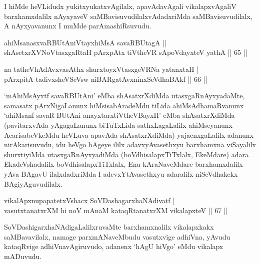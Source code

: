 \begin{artha}
I hiMde heVLidudx yukitxyukatxvAgilalx, apavAdavAgali vikalapxvAgaliV barxhamxdalilx nAyxyaveV saMBavisuvudilalxvAdadxriMda saMBavisuvudilalx, A nAyxyavanunx I muMde parAmashiRsuvudu.
\end{artha}


\begin{shl}
ahiMsanasxvaRBUtAniVtayxhiMsA savaRBUtagA ||  \\
shAsetxrXVNoVtasxgaRtaH pArxpAtx tiVtheVR sA\s poVdayxteV yathA \hfill||  65 ||  
\end{shl}

\begin{shl}
na tatheVhAdAvxvasAthx shurxtoyxVtasxgeVRNa yatanxtaH  | \\
pArxpitA tadivxsheVSeV\s sw niBARgatAvxninxSeVdhaBAkf \hfill ||  66 ||  
\end{shl}

\begin{artha}
`mAhiMsAyxtf savaRBUtAni' eMba shAsatxrXdiMda utasxgaRnAyxyadaMte, samasatx pArxNigaLanunx hiMsisabAradeMdu tiLida ahiMsAdhamaRvanunx `ahiMsanf savaR BUtAni anayxtarxtiVtheVBayxH' eMba shAsatxrXdiMda (pavitarxvAda yAgagaLanunx biTuTxLida sathxLagaLalilx ahiMseyanunx AcarisabeVkeMdu heVLuva apavAda shAsatxrXdiMda) yajacnxgaLalilx adanunx nirAkarisuvudu, idu heVgo hAgeye ililx adavxyAvasethxyu barxhamxna viSayalilx shurxtiyiMda utasxgaRnAyxyadiMda (boVdhisalapxTiTxlalx, EkeMdare) adara EkadeVshadalilx boVdhisalapxTiTxlalx, Enu kAraNaveMdare barxhamxdalilx yAva BAgavU ilalxdadxriMda I adevxYtAvasethxyu adaralilx niSeVdhakekx BAgiyAguvudilalx.
\end{artha}


\begin{shl}
vikalApxnupapatetxVshacx \footnotemark{}SoVDashagarxhaNAdivatf  | \\
vasutxtanatxrXM hi noV mAnaM kataqRtanatxrXM vikalapxteV \hfill ||  67 ||  
\end{shl}

\begin{artha}
SoVDashigarxhaNAdigaLalilxruvaMte barxhamxnalilx vikalapxkakx saMBavavilalx, namage parxmANaveMbudu vasutxvige adhiVna, yAvudu kataqRvige adhiVnavAgiruvudo, adanenx `hAgU hiVgo' eMdu vikalapx mADuvudu.
\end{artha}

